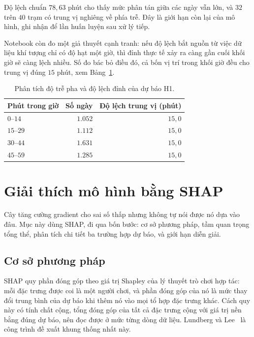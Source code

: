 \documentclass[12pt, a4paper]{report}
\begin{document}
Độ lệch chuẩn $78{,}63$ phút cho thấy mức phân tán giữa các ngày vẫn lớn, và $32$ trên $40$
trạm có trung vị nghiêng về phía trễ. Đây là giới hạn còn lại của mô hình, ghi nhận để lần huấn
luyện sau xử lý tiếp.

Notebook còn đo một giả thuyết cạnh tranh: nếu độ lệch bắt nguồn từ việc dữ liệu khí tượng chỉ
có độ hạt một giờ, thì đỉnh thực tế xảy ra càng gần cuối khối giờ sẽ càng lệch nhiều.
Số đo bác bỏ điều đó, cả bốn vị trí trong khối giờ đều cho trung vị đúng $15$ phút, xem Bảng~\ref{tab:lech_theo_vi_tri}.

\begin{table}[htbp]
\centering
\caption{Phân tích độ trễ pha và độ lệch đỉnh của dự báo H1.}
\label{tab:lech_theo_vi_tri}
\small
\begin{tabular}{l r r}
\toprule
\textbf{Phút trong giờ} & \textbf{Số ngày} & \textbf{Độ lệch trung vị (phút)} \\
\midrule
$0$--$14$  & $1.052$ & $15{,}0$ \\
$15$--$29$ & $1.112$ & $15{,}0$ \\
$30$--$44$ & $1.631$ & $15{,}0$ \\
$45$--$59$ & $1.285$ & $15{,}0$ \\
\bottomrule
\end{tabular}
\end{table}

\FloatBarrier
\section{Giải thích mô hình bằng SHAP}

Cây tăng cường gradient cho sai số thấp nhưng không tự nói được nó dựa vào đâu. Mục này dùng
SHAP, đi qua bốn bước: cơ sở phương pháp, tầm quan trọng tổng thể, phân tích chi tiết ba trường hợp dự báo, và
giới hạn diễn giải.

\FloatBarrier
\subsection{Cơ sở phương pháp}

SHAP quy phần đóng góp theo giá trị Shapley của lý thuyết trò chơi hợp tác: mỗi đặc trưng được
coi là một người chơi, và phần đóng góp của nó là mức thay đổi trung bình của dự báo khi thêm
nó vào mọi tổ hợp đặc trưng khác. Cách quy này có tính chất cộng, tổng đóng góp của tất cả
đặc trưng cộng với giá trị nền bằng đúng dự báo, nên đọc được ở mức từng dòng dữ liệu.
Lundberg và Lee~\cite{lundberg2017shap} là công trình đề xuất khung thống nhất này.
\end{document}
